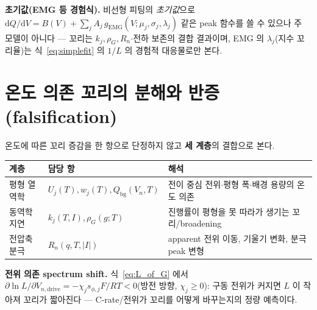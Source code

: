 \documentclass[11pt,a4paper]{article}
\newcommand{\dd}{\mathrm{d}}
\newcommand{\drive}{\mathrm{drive}}
\newcommand{\bg}{\mathrm{bg}}
\begin{document}
\textbf{초기값(EMG 등 경험식).} 비선형 피팅의 \emph{초기값}으로 $\dd Q/\dd V=B(V)+\sum_j A_j\,g_\mathrm{EMG}
(V;\mu_j,\sigma_j,\lambda_j)$ 같은 peak 함수를 쓸 수 있으나 주 모델이 아니다 — 꼬리는 $k_j,\rho_G,R_n$$\cdot$전하
보존의 결합 결과이며, EMG 의 $\lambda_j$(지수 꼬리율)는 식~\eqref{eq:simplefit} 의 $1/L$ 의 경험적 대응물로만 본다.

\section{온도 의존 꼬리의 분해와 반증(falsification)}\label{sec:falsify}
온도에 따른 꼬리 증감을 한 항으로 단정하지 않고 \textbf{세 계층}의 결합으로 본다.
\begin{longtable}{p{} p{} p{}}
\toprule 계층 & 담당 항 & 해석 \\ \midrule \endhead
평형 열역학 & $U_j(T),w_j(T),Q_\bg(V_n,T)$ & 전이 중심 전위$\cdot$평형 폭$\cdot$배경 용량의 온도 의존 \\
동역학 지연 & $k_j(T,I),\rho_G(g;T)$ & 진행률이 평형을 못 따라가 생기는 꼬리/broadening \\
전압축 분극 & $R_n(q,T,|I|)$ & apparent 전위 이동, 기울기 변화, 분극 peak 변형 \\
\bottomrule
\end{longtable}
\textbf{전위 의존 spectrum shift.} 식~\eqref{eq:L_of_G} 에서 $\partial\ln L/\partial V_{n,\drive}
=-\chi_j s_{\phi,j}F/RT<0$(방전 방향, $\chi_j\ge0$): 구동 전위가 커지면 $L$ 이 작아져 꼬리가 짧아진다 — C-rate/전위가
꼬리를 어떻게 바꾸는지의 정량 예측이다.
\end{document}
